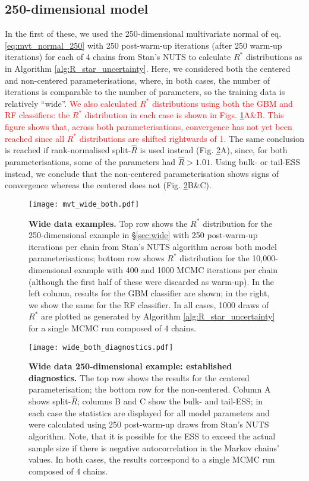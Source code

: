\documentclass{article}
\begin{document}
\subsection{250-dimensional model}
In the first of these, we used the 250-dimensional multivariate normal of eq. \eqref{eq:mvt_normal_250} with 250 post-warm-up iterations (after 250 warm-up iterations) for each of 4 chains from Stan's NUTS to calculate $R^*$ distributions as in Algorithm \ref{alg:R_star_uncertainty}. Here, we considered both the centered and non-centered parameterisations, where, in both cases, the number of iterations is comparable to the number of parameters, so the training data is relatively ``wide''. \textcolor{red}{We also calculated $R^*$ distributions using both the GBM and RF classifiers: the $R^*$ distribution in each case is shown in Figs. \ref{fig:mvt_wide_both}A\&B. This figure shows that, across both parameterisations, convergence has not yet been reached since all $R^*$ distributions are shifted rightwards of 1.} The same conclusion is reached if rank-normalised split-$\widehat{R}$ is used instead (Fig. \ref{fig:wide_both_diagnostics}A), since, for both parameterisations, some of the parameters had $\widehat{R}>1.01$. Using bulk- or tail-ESS instead, we conclude that the non-centered parameterisation shows signs of convergence whereas the centered does not (Fig. \ref{fig:wide_both_diagnostics}B\&C). 

\begin{figure}[!htb]
	\centerline{\texttt{[image: mvt\_wide\_both.pdf]}}
	\caption{\textbf{Wide data examples.} Top row shows the $R^*$ distribution for the 250-dimensional example in \S\ref{sec:wide} with 250 post-warm-up iterations per chain from Stan's NUTS algorithm across both model parameterisations; bottom row shows $R^*$ distribution for the 10,000-dimensional example with 400 and 1000 MCMC iterations per chain (although the first half of these were discarded as warm-up). In the left column, results for the GBM classifier are shown; in the right, we show the same for the RF classifier. In all cases, 1000 draws of $R^*$ are plotted as generated by Algorithm \ref{alg:R_star_uncertainty} for a single MCMC run composed of 4 chains.}
	\label{fig:mvt_wide_both}
\end{figure}

\begin{figure}[!htb]
	\centerline{\texttt{[image: wide\_both\_diagnostics.pdf]}}
	\caption{\textbf{Wide data 250-dimensional example: established diagnostics.} The top row shows the results for the centered parameterisation; the bottom row for the non-centered. Column A shows split-$\widehat{R}$; columns B and C show the bulk- and tail-ESS; in each case the statistics are displayed for all model parameters and were calculated using 250 post-warm-up draws from Stan's NUTS algorithm. Note, that it is possible for the ESS to exceed the actual sample size if there is negative autocorrelation in the Markov chains' values. In both cases, the results correspond to a single MCMC run composed of 4 chains.}
	\label{fig:wide_both_diagnostics}
\end{figure}
\end{document}
